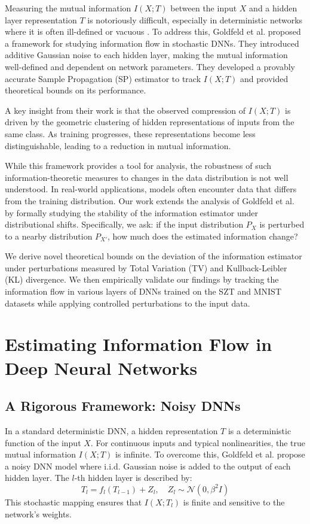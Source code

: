 \documentclass[conference]{IEEEtran}
\begin{document}
Measuring the mutual information $I(X;T)$ between the input $X$ and a hidden layer representation $T$ is notoriously difficult, especially in deterministic networks where it is often ill-defined or vacuous \cite{kolchinsky2019caveats}. To address this, Goldfeld et al. \cite{goldfeld2019estimating} proposed a framework for studying information flow in stochastic DNNs. They introduced additive Gaussian noise to each hidden layer, making the mutual information well-defined and dependent on network parameters. They developed a provably accurate Sample Propagation (SP) estimator to track $I(X;T)$ and provided theoretical bounds on its performance.

A key insight from their work is that the observed compression of $I(X;T)$ is driven by the geometric clustering of hidden representations of inputs from the same class. As training progresses, these representations become less distinguishable, leading to a reduction in mutual information.

While this framework provides a tool for analysis, the robustness of such information-theoretic measures to changes in the data distribution is not well understood. In real-world applications, models often encounter data that differs from the training distribution. Our work extends the analysis of Goldfeld et al. \cite{goldfeld2019estimating} by formally studying the stability of the information estimator under distributional shifts. Specifically, we ask: if the input distribution $P_X$ is perturbed to a nearby distribution $P_{X'}$, how much does the estimated information change?

We derive novel theoretical bounds on the deviation of the information estimator under perturbations measured by Total Variation (TV) and Kullback-Leibler (KL) divergence. We then empirically validate our findings by tracking the information flow in various layers of DNNs trained on the SZT and MNIST datasets while applying controlled perturbations to the input data.

\section{Estimating Information Flow in Deep Neural Networks}

\subsection{A Rigorous Framework: Noisy DNNs}
In a standard deterministic DNN, a hidden representation $T$ is a deterministic function of the input $X$. For continuous inputs and typical nonlinearities, the true mutual information $I(X;T)$ is infinite. To overcome this, Goldfeld et al. \cite{goldfeld2019estimating} propose a noisy DNN model where i.i.d. Gaussian noise is added to the output of each hidden layer. The $l$-th hidden layer is described by:
\begin{equation}
T_l = f_l(T_{l-1}) + Z_l, \quad Z_l \sim \mathcal{N}(0, \beta^2 I)
\label{eq:noisy_layer}
\end{equation}
This stochastic mapping ensures that $I(X;T_l)$ is finite and sensitive to the network's weights.
\end{document}
